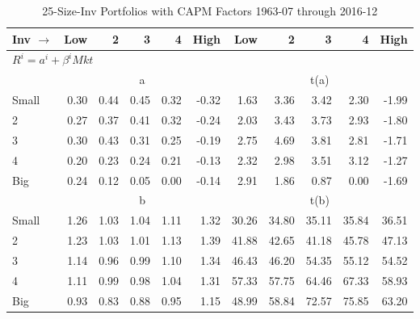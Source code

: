 
\begin{table}[!ht]
\centering
\caption{25-Size-Inv Portfolios with CAPM Factors 1963-07 through 2016-12}
\begin{tabular}{lrrrrrrrrrr}
  \toprule
    Inv $\rightarrow$ & Low & 2 & 3 & 4 & High & Low & 2 & 3 & 4 & High \\ 
  \midrule
  \multicolumn{11}{l}{$R^i=a^i+\beta^iMkt$} \\

  
    
      & \multicolumn{5}{c}{a} & \multicolumn{5}{c}{t(a)}
    
    \\
      \cmidrule(r){2-6} \cmidrule(r){7-11}

    Small   & 0.30  & 0.44  & 0.45  & 0.32  & -0.32  & 1.63  & 3.36  & 3.42  & 2.30  & -1.99  \\
         2  & 0.27  & 0.37  & 0.41  & 0.32  & -0.24  & 2.03  & 3.43  & 3.73  & 2.93  & -1.80  \\
         3  & 0.30  & 0.43  & 0.31  & 0.25  & -0.19  & 2.75  & 4.69  & 3.81  & 2.81  & -1.71  \\
         4  & 0.20  & 0.23  & 0.24  & 0.21  & -0.13  & 2.32  & 2.98  & 3.51  & 3.12  & -1.27  \\
    Big     & 0.24  & 0.12  & 0.05  & 0.00  & -0.14  & 2.91  & 1.86  & 0.87  & 0.00  & -1.69  \\

  
    
      & \multicolumn{5}{c}{b} & \multicolumn{5}{c}{t(b)}
    
    \\
      \cmidrule(r){2-6} \cmidrule(r){7-11}

    Small   & 1.26  & 1.03  & 1.04  & 1.11  & 1.32  & 30.26  & 34.80  & 35.11  & 35.84  & 36.51  \\
         2  & 1.23  & 1.03  & 1.01  & 1.13  & 1.39  & 41.88  & 42.65  & 41.18  & 45.78  & 47.13  \\
         3  & 1.14  & 0.96  & 0.99  & 1.10  & 1.34  & 46.43  & 46.20  & 54.35  & 55.12  & 54.52  \\
         4  & 1.11  & 0.99  & 0.98  & 1.04  & 1.31  & 57.33  & 57.75  & 64.46  & 67.33  & 58.93  \\
    Big     & 0.93  & 0.83  & 0.88  & 0.95  & 1.15  & 48.99  & 58.84  & 72.57  & 75.85  & 63.20  \\

  

  \bottomrule
\end{tabular}
\label{tbl:25_Size_Inv_CAPM}
\end{table}
